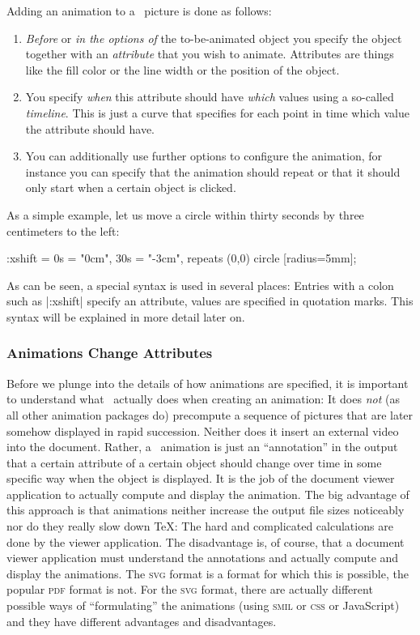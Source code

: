 Adding an animation to a \tikzname\ picture is done as follows:
%
\begin{enumerate}
    \item \emph{Before} or \emph{in the options of} the to-be-animated object
        you specify the object together with an \emph{attribute} that you wish
        to animate. Attributes are things like the fill color or the line width
        or the position of the object.
    \item You specify \emph{when} this attribute should have \emph{which}
        values using a so-called \emph{timeline}. This is just a curve that
        specifies for each point in time which value the attribute should have.
    \item You can additionally use further options to configure the animation,
        for instance you can specify that the animation should repeat or that
        it should only start when a certain object is clicked.
\end{enumerate}

As a simple example, let us move a circle within thirty seconds by three
centimeters to the left:
%
\begin{codeexample}[width=2cm,preamble={\usetikzlibrary{animations}}]
\tikz \draw :xshift = {0s = "0cm", 30s = "-3cm", repeats} (0,0) circle [radius=5mm];
\end{codeexample}

As can be seen, a special syntax is used in several places: Entries with a
colon such as |:xshift| specify an attribute, values are specified in quotation
marks. This syntax will be explained in more detail later on.


\subsubsection{Animations Change Attributes}

Before we plunge into the details of how animations are specified, it is
important to understand what \tikzname\ actually does when creating an
animation: It does \emph{not} (as all other animation packages do) precompute a
sequence of pictures that are later somehow displayed in rapid succession.
Neither does it insert an external video into the document. Rather, a
\tikzname\ animation is just an ``annotation'' in the output that a certain
attribute of a certain object should change over time in some specific way when
the object is displayed. It is the job of the document viewer application to
actually compute and display the animation. The big advantage of this approach
is that animations neither increase the output file sizes noticeably nor do
they really slow down \TeX: The hard and complicated calculations are done by
the viewer application. The disadvantage is, of course, that a document viewer
application must understand the annotations and actually compute and display
the animations. The \textsc{svg} format is a format for which this is possible,
the popular \textsc{pdf} format is not. For the \textsc{svg} format, there are
actually different possible ways of ``formulating'' the animations (using
\textsc{smil} or \textsc{css} or JavaScript) and they have different advantages
and disadvantages.

